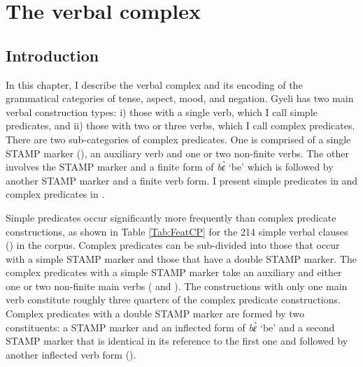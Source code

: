 \chapter{The verbal complex}
\label{sec:TAM}

\section{Introduction}
\label{sec:TAMIntro}


In this chapter, I describe the verbal complex and its encoding of the grammatical categories of tense, aspect, mood, and negation. Gyeli has two main verbal construction types: i) those with a single verb, which I call simple predicates, and ii) those with two or three verbs, which I call complex predicates. There are two sub-categories of complex predicates. One is comprised of a single STAMP marker (), an auxiliary verb and one or two non-finite verbs. The other involves the STAMP marker and a finite form of {\itshape bɛ̀} `be' which is followed by another STAMP marker and a finite verb form. I present simple predicates in  and complex predicates in . 

Simple predicates occur significantly more frequently than complex predicate constructions, as shown in Table \ref{Tab:FeatCP} for the 214 simple verbal clauses () in the corpus.  Complex predicates can be sub-divided into those that occur with a simple STAMP marker and those that have a double STAMP marker. The complex predicates with a simple STAMP marker  take an auxiliary and either one or two non-finite main verbs ( and ). The constructions with only one main verb constitute roughly three quarters of the complex predicate constructions. Complex predicates with a double STAMP marker are formed by two constituents: a STAMP marker and an inflected form of {\itshape bɛ̀} `be' and a second STAMP marker that is identical in its reference to the first one and followed by another inflected verb form ().

